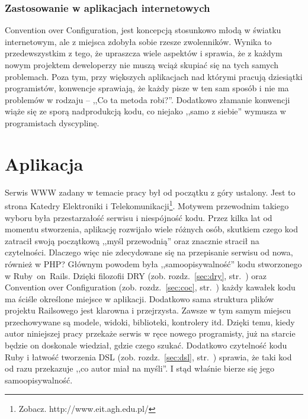 \documentclass[a4paper,12pt,oneside]{report}
\begin{document}
\subsection{Zastosowanie w aplikacjach internetowych}
\label{coc:web}
Convention over Configuration, jest koncepcją stosunkowo młodą w światku internetowym, ale z miejsca zdobyła sobie rzesze zwolenników. Wynika to przedewszystkim z tego, że upraszcza wiele aspektów i sprawia, że z każdym nowym projektem deweloperzy nie muszą wciąż skupiać się na tych samych problemach. Poza tym, przy większych aplikacjach nad którymi pracują dziesiątki programistów, konwencje sprawiają, że każdy pisze w ten sam sposób i nie ma problemów w rodzaju -- ,,Co ta metoda robi?''. Dodatkowo złamanie konwencji wiąże się ze sporą nadprodukcją kodu, co niejako ,,samo z siebie'' wymusza w programistach dyscyplinę.

\chapter{Aplikacja}
\label{cha:app}
Serwis WWW zadany w temacie pracy był od początku z góry ustalony. Jest to strona Katedry Elektroniki i Telekomunikacji\footnote{Zobacz. http://www.eit.agh.edu.pl/}. Motywem przewodnim takiego wyboru była przestarzałość serwisu i niespójność kodu. Przez kilka lat od momentu stworzenia, aplikację rozwijało wiele różnych osób, skutkiem czego kod zatracił swoją początkową ,,myśl przewodnią'' oraz znacznie stracił na czytelności. Dlaczego więc nie zdecydowane się na przepisanie serwisu od nowa, również w PHP? Głównym powodem była ,,samoopisywalność'' kodu stworzonego w Ruby~on~Rails. Dzięki filozofii DRY (zob. rozdz.~\ref{sec:dry}, str.~\pageref{sec:dry}) oraz Convention over Configuration (zob. rozdz.~\ref{sec:coc}, str.~\pageref{sec:coc}) każdy kawałek kodu ma ściśle określone miejsce w aplikacji. Dodatkowo sama struktura plików projektu Railsowego jest klarowna i przejrzysta. Zawsze w tym samym miejscu przechowywane są modele, widoki, biblioteki, kontrolery itd. Dzięki temu, kiedy autor niniejszej pracy przekaże serwis w ręce nowego programisty, już na starcie będzie on doskonale wiedział, gdzie czego szukać. Dodatkowo czytelność kodu Ruby i łatwość tworzenia DSL (zob. rozdz.~\ref{sec:dsl}, str.~\pageref{sec:dsl}) sprawia, że taki kod od razu przekazuje ,,co autor miał na myśli''. I stąd właśnie bierze się jego samoopisywalność.
\end{document}
